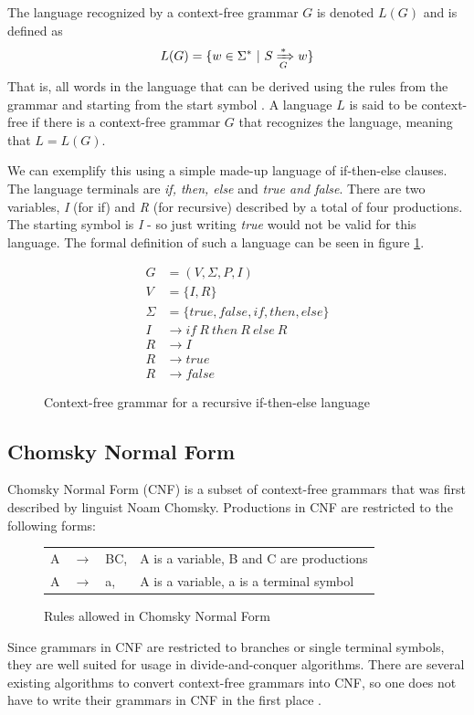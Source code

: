 \documentclass[a4paper,12pt,twosided]{report}
\begin{document}
The language recognized by a context-free grammar $G$ is denoted $L(G)$ and is
defined as 
\[
L(G) = \{w \in \Sigma^* \ |\  S \xRightarrow[G]{*} w\}
\]
That is, all words in the language that can be derived using the rules from the
grammar and starting from the start symbol \cite[p. 177]{automatabook}.  A
language $L$ is said to be context-free if there is a context-free grammar $G$
that recognizes the language, meaning that $L = L(G)$.

We can exemplify this using a simple made-up language of if-then-else clauses.
The language terminals are \textit{if, then, else} and \textit{true and false}.
There are two variables, \textit{I} (for if) and \textit{R} (for recursive)
described by a total of four productions. The starting symbol is \textit{I} - so
just writing \textit{true} would not be valid for this language. The formal
definition of such a language can be seen in figure \ref{iflang}.

\begin{figure}[H]
\begin{align*}
G &= (V, \Sigma , P, I) \\
V &= \{I,R\} \\
\Sigma &= \{true,false,if,then,else\} \\
I &\rightarrow if\ R\ then\ R\ else\ R \\
R &\rightarrow I \\
R &\rightarrow true \\
R &\rightarrow false
\end{align*}
\caption{Context-free grammar for a recursive if-then-else language}
\label{iflang}
\end{figure}

\subsection{Chomsky Normal Form}
Chomsky Normal Form (CNF) is a subset of context-free grammars that was first
described by linguist Noam Chomsky. Productions in CNF are restricted to the
following forms:

\begin{figure}[H]
\begin{tabular}{l l l l}
    A & $\rightarrow$ & BC, & A is a variable, B and C are productions \\
    A & $\rightarrow$ & a, & A is a variable, a is a terminal symbol \\
\end{tabular}
\caption{Rules allowed in Chomsky Normal Form}
\end{figure}
Since grammars in CNF are restricted to branches or single terminal symbols,
they are well suited for usage in divide-and-conquer algorithms. There are
several existing algorithms to convert context-free grammars into CNF, so one
does not have to write their grammars in CNF in the first place \cite{langeleiss}.
\end{document}
